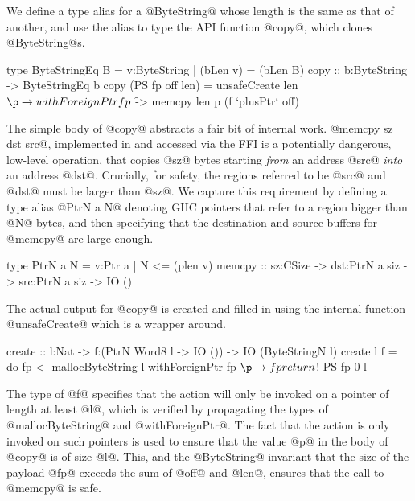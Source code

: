 We define a type alias for a @ByteString@ whose length is the same
as that of another, and use the alias to type the API 
function @copy@, which clones @ByteString@s.

\begin{code}
  type ByteStringEq B 
    = {v:ByteString | (bLen v) = (bLen B)}
  copy :: b:ByteString -> ByteStringEq b 
  copy (PS fp off len) 
    = unsafeCreate len $ \p -> 
        withForeignPtr fp $ \f ->
          memcpy len p (f `plusPtr` off) 
\end{code}

The simple body of @copy@ abstracts a fair bit of internal work. 
@memcpy sz dst src@, implemented in \C and accessed via the FFI is a potentially
dangerous, low-level operation, that copies @sz@ bytes starting
\emph{from} an address @src@ \emph{into} an address @dst@. 
Crucially, for safety, the regions referred to be @src@ and @dst@ 
must be larger than @sz@. We capture this requirement by defining
a type alias @PtrN a N@ denoting GHC pointers that refer to a region
bigger than @N@ bytes, and then specifying that the destination
and source buffers for @memcpy@ are large enough. 

\begin{code}
  type PtrN a N = {v:Ptr a | N <= (plen v)}
  memcpy :: sz:CSize -> dst:PtrN a siz 
                     -> src:PtrN a siz 
                     -> IO () 
\end{code}


The actual output for @copy@ is created and filled in using the 
internal function @unsafeCreate@ which is a wrapper around. 
\begin{code}
  create :: l:Nat -> f:(PtrN Word8 l -> IO ())
         -> IO (ByteStringN l)
  create l f = do
      fp <- mallocByteString l
      withForeignPtr fp $ \p -> f p
      return $! PS fp 0 l
\end{code}

%
The type of @f@ specifies that the action
will only be invoked on a pointer of length at least 
@l@, which is verified by propagating the types of
@mallocByteString@ and @withForeignPtr@. 
%
The fact that the action is only invoked on such pointers 
is used to ensure that the value @p@ in the body of @copy@ 
is of size @l@. This, and the @ByteString@ 
invariant that the size of the payload @fp@ 
exceeds the sum of @off@ and @len@, ensures 
that the call to @memcpy@ is safe.

